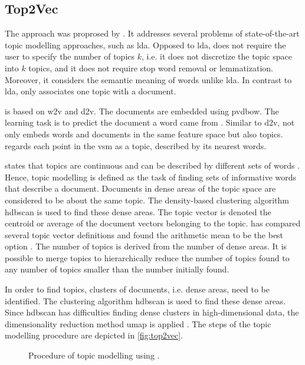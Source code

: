 \subsection{Top2Vec}\label{subsec:top2vec}

The approach \topTwovec{} was proprosed by \citeauthor{Top2Vec2020} \cite{Top2Vec2020}.
It addresses several problems of state-of-the-art topic modelling approaches, such as \ac{lda}.
Opposed to \ac{lda}, \topTwovec{} does not require the user to specify the number of topics $k$, 
i.e. it does not discretize the topic space into $k$ topics, 
and it does not require stop word removal or lemmatization.
Moreover, it considers the semantic meaning of words unlike \ac{lda}.
In contrast to \ac{lda}, \topTwovec{} only associates one topic with a document.

\topTwovec{} is based on \ac{w2v} and \ac{d2v}.
The documents are embedded using \ac{pvdbow}.
The learning task is to predict the document a word came from \cite{Top2Vec2020}.
Similar to \ac{d2v}, \topTwovec{} not only embeds words and documents in the same feature space but also topics.
\citeauthor{Top2Vec2020} regards each point in the \ac{vsm} as a topic, described by its nearest words.

\citeauthor{Top2Vec2020} states that topics are continuous and can be described by different sets of words \cite{Top2Vec2020}.
Hence, topic modelling is defined as the task of finding sets of informative words that describe a document.
Documents in dense areas of the topic space are considered to be about the same topic.
The density-based clustering algorithm \ac{hdbscan} is used to find these dense areas.
The topic vector is denoted the centroid or average of the document vectors belonging to the topic.
\citeauthor{Top2Vec2020} has compared several topic vector definitions and found the arithmetic mean to be the best option \cite{Top2Vec2020}.
The number of topics is derived from the number of dense areas.
It is possible to merge topics to hierarchically reduce the number of topics found to any number of topics smaller than the number initially found.

In order to find topics, clusters of documents, i.e. dense areas, need to be identified.
The clustering algorithm \ac{hdbscan} is used to find these dense areas.
Since \ac{hdbscan} has difficulties finding dense clusters in high-dimensional data, 
the dimensionality reduction method \ac{umap} is applied \cite{Top2Vec2020}.
The steps of the topic modelling procedure \topTwovec{} are depicted in \autoref{fig:top2vec}.

\begin{figure}[htp] %
    \centering
    
    \caption{Procedure of topic modelling using \topTwovec{}.}
    \label{fig:top2vec}
\end{figure}